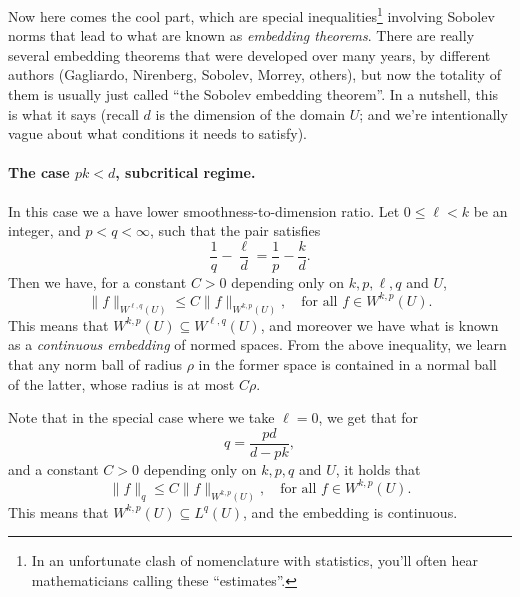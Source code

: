 \documentclass{article}
\begin{document}
Now here comes the cool part, which are special inequalities\footnote{In an
  unfortunate clash of nomenclature with statistics, you'll often hear
  mathematicians calling these ``estimates''.} involving Sobolev norms that lead 
to what are known as \emph{embedding theorems}. There are really several
embedding theorems that were developed over many years, by different authors
(Gagliardo, Nirenberg, Sobolev, Morrey, others), but now the totality of them is
usually just called ``the Sobolev embedding theorem''. In a nutshell, this is
what it says (recall $d$ is the dimension of the domain $U$; and we're
intentionally vague about what conditions it needs to satisfy).  

\paragraph{The case $pk < d$, subcritical regime.}

In this case we a have lower smoothness-to-dimension ratio. Let $0 \leq \ell <
k$ be an integer, and $p < q < \infty$, such that the pair satisfies   
\[
\frac{1}{q} - \frac{\ell}{d} = \frac{1}{p} - \frac{k}{d}.
\]
Then we have, for a constant $C>0$ depending only on $k,p,\ell,q$ and $U$, 
\[
\|f\|_{W^{\ell,q}(U)} \leq C \|f\|_{W^{k,p}(U)}, \quad \text{for all $f \in
  W^{k,p}(U)$}.
\]
This means that $W^{k,p}(U) \subseteq W^{\ell,q}(U)$, and moreover we have what 
is known as a \emph{continuous embedding} of normed spaces. From the above    
inequality, we learn that any norm ball of radius $\rho$ in the former space
is contained in a normal ball of the latter, whose radius is at most $C\rho$.

Note that in the special case where we take $\ell = 0$, we get that for  
\[
q = \frac{pd}{d-pk},
\]
and a constant $C>0$ depending only on $k,p,q$ and $U$, it holds that 
\[
\|f\|_q \leq C \|f\|_{W^{k,p}(U)}, \quad \text{for all $f \in W^{k,p}(U)$}. 
\]
This means that $W^{k,p}(U) \subseteq L^q(U)$, and the embedding is continuous.  


\end{document}
